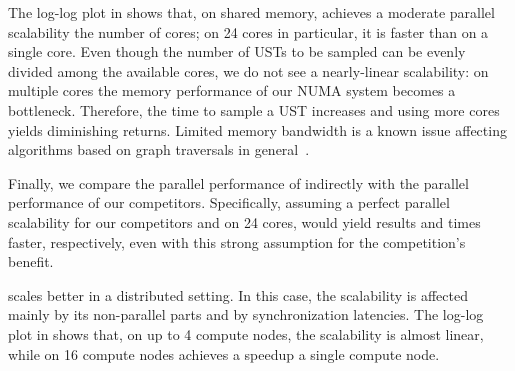 The log-log plot in  shows that, on shared memory,
\ust achieves a moderate parallel scalability \wrt the number of cores; on 24 cores in
particular, it is \shmemspeedup faster than on a single core.
Even though the number of USTs to be sampled can be evenly divided among the available
cores, we do not see a nearly-linear scalability: on multiple cores the memory performance
of our NUMA system becomes a bottleneck. Therefore, the time to sample a UST increases
and using more cores yields diminishing returns.
Limited memory bandwidth is a known issue affecting algorithms based on graph traversals
in general~\cite{DBLP:conf/icpp/BaderCF05,DBLP:journals/ppl/LumsdaineGHB07}.

Finally, we compare the parallel performance of \ust indirectly with the
parallel performance of our competitors. Specifically, assuming a perfect
parallel scalability for our competitors \bekas and \bekash on 24 cores, \ust
would yield results  and  times faster,
respectively, even with this strong assumption for the competition's benefit.

\ust scales better in a distributed setting. In this case, the scalability is affected
mainly by its non-parallel parts and by synchronization latencies.
The log-log plot in  shows that, on up to 4
compute nodes, the scalability is almost linear, while on 16 compute nodes \ust
achieves a \distrspeedup speedup \wrt a single compute node.

